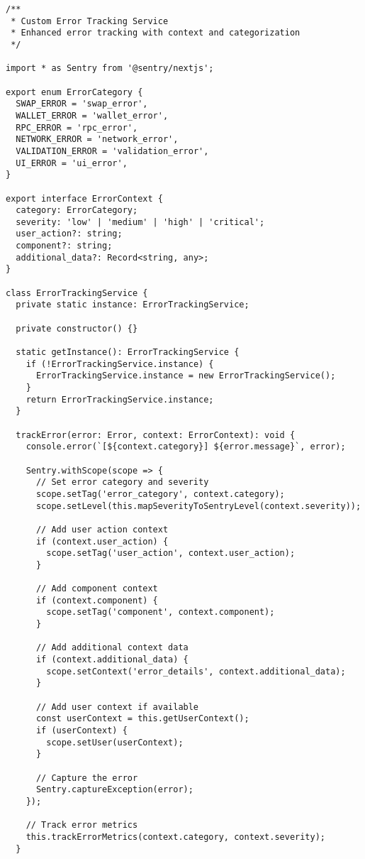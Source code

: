 \documentclass[11pt,a4paper]{article}
\begin{document}
\begin{lstlisting}[style=javascript, caption=Custom Error Tracking Service]
/**
 * Custom Error Tracking Service
 * Enhanced error tracking with context and categorization
 */

import * as Sentry from '@sentry/nextjs';

export enum ErrorCategory {
  SWAP_ERROR = 'swap_error',
  WALLET_ERROR = 'wallet_error',
  RPC_ERROR = 'rpc_error',
  NETWORK_ERROR = 'network_error',
  VALIDATION_ERROR = 'validation_error',
  UI_ERROR = 'ui_error',
}

export interface ErrorContext {
  category: ErrorCategory;
  severity: 'low' | 'medium' | 'high' | 'critical';
  user_action?: string;
  component?: string;
  additional_data?: Record<string, any>;
}

class ErrorTrackingService {
  private static instance: ErrorTrackingService;
  
  private constructor() {}
  
  static getInstance(): ErrorTrackingService {
    if (!ErrorTrackingService.instance) {
      ErrorTrackingService.instance = new ErrorTrackingService();
    }
    return ErrorTrackingService.instance;
  }
  
  trackError(error: Error, context: ErrorContext): void {
    console.error(`[${context.category}] ${error.message}`, error);
    
    Sentry.withScope(scope => {
      // Set error category and severity
      scope.setTag('error_category', context.category);
      scope.setLevel(this.mapSeverityToSentryLevel(context.severity));
      
      // Add user action context
      if (context.user_action) {
        scope.setTag('user_action', context.user_action);
      }
      
      // Add component context
      if (context.component) {
        scope.setTag('component', context.component);
      }
      
      // Add additional context data
      if (context.additional_data) {
        scope.setContext('error_details', context.additional_data);
      }
      
      // Add user context if available
      const userContext = this.getUserContext();
      if (userContext) {
        scope.setUser(userContext);
      }
      
      // Capture the error
      Sentry.captureException(error);
    });
    
    // Track error metrics
    this.trackErrorMetrics(context.category, context.severity);
  }
  

\end{lstlisting}
\end{document}
